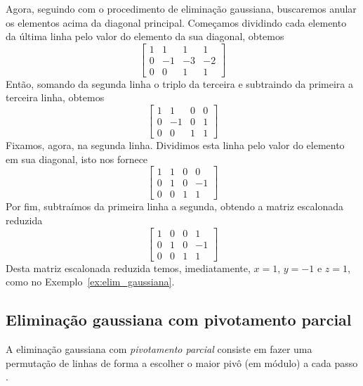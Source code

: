 \documentclass[
	12pt,				%
	oneside,			%
	a4paper,			%
	english,			%
	french,				%
	spanish,			%
	brazil				%
	]{abntex2}
\begin{document}
\begin{ex}
Agora, seguindo com o procedimento de eliminação gaussiana, buscaremos anular os elementos acima da diagonal principal. Começamos dividindo cada elemento da última linha pelo valor do elemento da sua diagonal, obtemos
\begin{equation}
  \begin{bmatrix}
    1 & 1 & 1 & 1\\
    0 & -1 & -3 & -2\\
    0 & 0 & 1 & 1
  \end{bmatrix}
\end{equation}
Então, somando da segunda linha o triplo da terceira e subtraindo da primeira a terceira linha, obtemos
\begin{equation}
  \begin{bmatrix}
    1 & 1 & 0 & 0\\
    0 & -1 & 0 & 1\\
    0 & 0 & 1 & 1
  \end{bmatrix}
\end{equation}
Fixamos, agora, na segunda linha. Dividimos esta linha pelo valor do elemento em sua diagonal, isto nos fornece
\begin{equation}
  \begin{bmatrix}
    1 & 1 & 0 & 0\\
    0 & 1 & 0 & -1\\
    0 & 0 & 1 & 1
  \end{bmatrix}
\end{equation}
Por fim, subtraímos da primeira linha a segunda, obtendo a matriz escalonada reduzida
\begin{equation}
  \begin{bmatrix}
    1 & 0 & 0 & 1\\
    0 & 1 & 0 & -1\\
    0 & 0 & 1 & 1
  \end{bmatrix}
\end{equation}
Desta matriz escalonada reduzida temos, imediatamente, $x=1$, $y=-1$ e $z=1$, como no Exemplo~\ref{ex:elim_gaussiana}.
\end{ex}

\subsection{Eliminação gaussiana com pivotamento parcial}
A eliminação gaussiana com \emph{pivotamento parcial} consiste em fazer uma permutação de linhas de forma a escolher o maior pivô (em módulo) a cada passo \cite{neide}.
\end{document}
